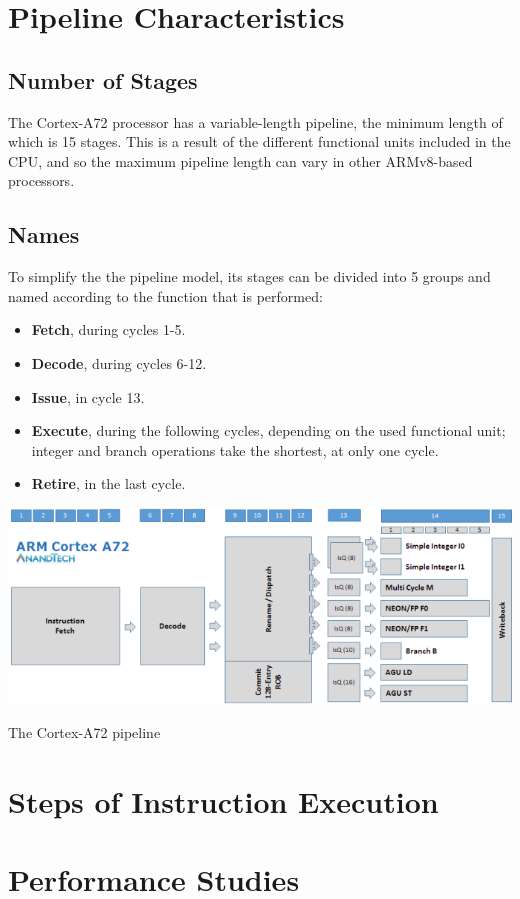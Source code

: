 \section{Pipeline Characteristics}
\subsection*{Number of Stages}
\hspace{\parindent}The Cortex-A72 processor has a variable-length pipeline, the minimum length of which is 15 stages. This is a result of the different functional units included in the CPU, and so the maximum pipeline length can vary in other ARMv8-based processors. \cite{a72pipeline}
\subsection*{Names}
\hspace{\parindent}To simplify the the pipeline model, its stages can be divided into 5 groups and named according to the function that is performed: \cite{cortexA72manual}
\begin{itemize}
	\item \textbf{Fetch}, during cycles 1-5.
	\item \textbf{Decode}, during cycles 6-12.
	\item \textbf{Issue}, in cycle 13.
	\item \textbf{Execute}, during the following cycles, depending on the used functional unit; integer and branch operations take the shortest, at only one cycle.
	\item \textbf{Retire}, in the last cycle.
\end{itemize}
\includegraphics[width=1\linewidth]{imgs/a72pipeline.png}
\caption{The Cortex-A72 pipeline}

\section{Steps of Instruction Execution}

\section{Performance Studies}

